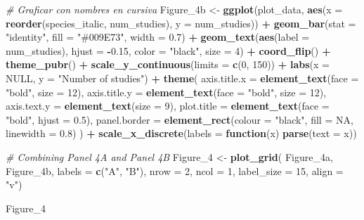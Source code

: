 \documentclass[
]{article}
\newenvironment{Shaded}{\begin{snugshade}}{\end{snugshade}}
\newcommand{\AttributeTok}[1]{\textcolor[rgb]{0.13,0.29,0.53}{#1}}
\newcommand{\CommentTok}[1]{\textcolor[rgb]{0.56,0.35,0.01}{\textit{#1}}}
\newcommand{\ConstantTok}[1]{\textcolor[rgb]{0.56,0.35,0.01}{#1}}
\newcommand{\ControlFlowTok}[1]{\textcolor[rgb]{0.13,0.29,0.53}{\textbf{#1}}}
\newcommand{\DecValTok}[1]{\textcolor[rgb]{0.00,0.00,0.81}{#1}}
\newcommand{\FloatTok}[1]{\textcolor[rgb]{0.00,0.00,0.81}{#1}}
\newcommand{\FunctionTok}[1]{\textcolor[rgb]{0.13,0.29,0.53}{\textbf{#1}}}
\newcommand{\NormalTok}[1]{#1}
\newcommand{\OtherTok}[1]{\textcolor[rgb]{0.56,0.35,0.01}{#1}}
\newcommand{\SpecialCharTok}[1]{\textcolor[rgb]{0.81,0.36,0.00}{\textbf{#1}}}
\newcommand{\StringTok}[1]{\textcolor[rgb]{0.31,0.60,0.02}{#1}}
\begin{document}
\begin{Shaded}
\begin{Highlighting}[]
\CommentTok{\# Graficar con nombres en cursiva}
\NormalTok{Figure\_4b }\OtherTok{\textless{}{-}} \FunctionTok{ggplot}\NormalTok{(plot\_data, }\FunctionTok{aes}\NormalTok{(}\AttributeTok{x =} \FunctionTok{reorder}\NormalTok{(species\_italic, num\_studies), }\AttributeTok{y =}\NormalTok{ num\_studies)) }\SpecialCharTok{+}
  \FunctionTok{geom\_bar}\NormalTok{(}\AttributeTok{stat =} \StringTok{"identity"}\NormalTok{, }\AttributeTok{fill =} \StringTok{"\#009E73"}\NormalTok{, }\AttributeTok{width =} \FloatTok{0.7}\NormalTok{) }\SpecialCharTok{+}
  \FunctionTok{geom\_text}\NormalTok{(}\FunctionTok{aes}\NormalTok{(}\AttributeTok{label =}\NormalTok{ num\_studies), }\AttributeTok{hjust =} \SpecialCharTok{{-}}\FloatTok{0.15}\NormalTok{, }\AttributeTok{color =} \StringTok{"black"}\NormalTok{, }\AttributeTok{size =} \DecValTok{4}\NormalTok{) }\SpecialCharTok{+}
  \FunctionTok{coord\_flip}\NormalTok{() }\SpecialCharTok{+}
  \FunctionTok{theme\_pubr}\NormalTok{() }\SpecialCharTok{+}
  \FunctionTok{scale\_y\_continuous}\NormalTok{(}\AttributeTok{limits =} \FunctionTok{c}\NormalTok{(}\DecValTok{0}\NormalTok{, }\DecValTok{150}\NormalTok{)) }\SpecialCharTok{+}
  \FunctionTok{labs}\NormalTok{(}\AttributeTok{x =} \ConstantTok{NULL}\NormalTok{, }\AttributeTok{y =} \StringTok{"Number of studies"}\NormalTok{) }\SpecialCharTok{+}
  \FunctionTok{theme}\NormalTok{(}
    \AttributeTok{axis.title.x =} \FunctionTok{element\_text}\NormalTok{(}\AttributeTok{face =} \StringTok{"bold"}\NormalTok{, }\AttributeTok{size =} \DecValTok{12}\NormalTok{),}
    \AttributeTok{axis.title.y =} \FunctionTok{element\_text}\NormalTok{(}\AttributeTok{face =} \StringTok{"bold"}\NormalTok{, }\AttributeTok{size =} \DecValTok{12}\NormalTok{),}
    \AttributeTok{axis.text.y =} \FunctionTok{element\_text}\NormalTok{(}\AttributeTok{size =} \DecValTok{9}\NormalTok{),}
    \AttributeTok{plot.title =} \FunctionTok{element\_text}\NormalTok{(}\AttributeTok{face =} \StringTok{"bold"}\NormalTok{, }\AttributeTok{hjust =} \FloatTok{0.5}\NormalTok{),}
    \AttributeTok{panel.border =} \FunctionTok{element\_rect}\NormalTok{(}\AttributeTok{colour =} \StringTok{"black"}\NormalTok{, }\AttributeTok{fill =} \ConstantTok{NA}\NormalTok{, }\AttributeTok{linewidth =} \FloatTok{0.8}\NormalTok{)}
\NormalTok{  ) }\SpecialCharTok{+}
  \FunctionTok{scale\_x\_discrete}\NormalTok{(}\AttributeTok{labels =} \ControlFlowTok{function}\NormalTok{(x) }\FunctionTok{parse}\NormalTok{(}\AttributeTok{text =}\NormalTok{ x))}

\CommentTok{\# Combining Panel 4A and Panel 4B}
\NormalTok{Figure\_4 }\OtherTok{\textless{}{-}} \FunctionTok{plot\_grid}\NormalTok{(}
\NormalTok{  Figure\_4a, }
\NormalTok{  Figure\_4b,}
  \AttributeTok{labels =} \FunctionTok{c}\NormalTok{(}\StringTok{"A"}\NormalTok{, }\StringTok{"B"}\NormalTok{),}
  \AttributeTok{nrow =} \DecValTok{2}\NormalTok{,}
  \AttributeTok{ncol =} \DecValTok{1}\NormalTok{,}
  \AttributeTok{label\_size =} \DecValTok{15}\NormalTok{,}
  \AttributeTok{align =} \StringTok{"v"}\NormalTok{)}

\NormalTok{Figure\_4}
\end{Highlighting}
\end{Shaded}
\end{document}
